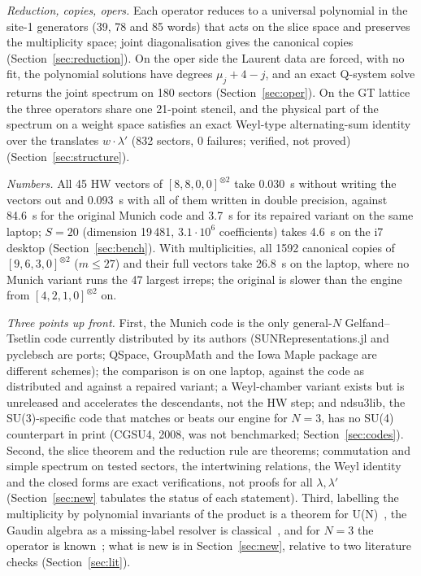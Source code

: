 \documentclass[11pt]{article}
\begin{document}
\emph{Reduction, copies, opers.}
Each operator reduces to a universal polynomial in the site-1 generators (39, 78 and 85 words) that acts on the slice space and preserves the multiplicity space; joint diagonalisation gives the canonical copies (Section~\ref{sec:reduction}).
On the oper side the Laurent data are forced, with no fit, the polynomial solutions have degrees $\mu_j+4-j$, and an exact Q-system solve returns the joint spectrum on 180 sectors (Section~\ref{sec:oper}).
On the GT lattice the three operators share one 21-point stencil, and the physical part of the spectrum on a weight space satisfies an exact Weyl-type alternating-sum identity over the translates $w\cdot\lambda'$ (832 sectors, 0 failures; verified, not proved) (Section~\ref{sec:structure}).

\emph{Numbers.}
All 45 HW vectors of $[8,8,0,0]^{\otimes2}$ take 0.030~s without writing the vectors out and 0.093~s with all of them written in double precision, against 84.6~s for the original Munich code and 3.7~s for its repaired variant on the same laptop; $S=20$ (dimension 19\,481, $3.1\cdot10^6$ coefficients) takes 4.6~s on the i7 desktop (Section~\ref{sec:bench}).
With multiplicities, all 1592 canonical copies of $[9,6,3,0]^{\otimes2}$ ($m\le27$) and their full vectors take 26.8~s on the laptop, where no Munich variant runs the 47 largest irreps; the original is slower than the engine from $[4,2,1,0]^{\otimes2}$ on.

\emph{Three points up front.}
First, the Munich code is the only general-$N$ Gelfand--Tsetlin code currently distributed by its authors (SUNRepresentations.jl and pyclebsch are ports; QSpace, GroupMath and the Iowa Maple package are different schemes); the comparison is on one laptop, against the code as distributed and against a repaired variant; a Weyl-chamber variant exists but is unreleased and accelerates the descendants, not the HW step; and ndsu3lib, the SU(3)-specific code that matches or beats our engine for $N=3$, has no SU(4) counterpart in print (CGSU4, 2008, was not benchmarked; Section~\ref{sec:codes}).
Second, the slice theorem and the reduction rule are theorems; commutation and simple spectrum on tested sectors, the intertwining relations, the Weyl identity and the closed forms are exact verifications, not proofs for all $\lambda,\lambda'$ (Section~\ref{sec:new} tabulates the status of each statement).
Third, labelling the multiplicity by polynomial invariants of the product is a theorem for U(N)~\cite{klink,gkt}, the Gaudin algebra as a missing-label resolver is classical~\cite{vinberg,rybnikov,ffr,mtv,hkrw}, and for $N=3$ the operator is known~\cite{psv,cpv}; what is new is in Section~\ref{sec:new}, relative to two literature checks (Section~\ref{sec:lit}).
\end{document}
